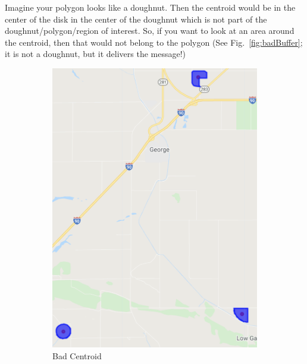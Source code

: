 \documentclass{article}
\begin{document}
{\color{red}{Warning:}} 
Imagine your polygon looks like a doughnut.
Then the centroid would be in the center 
of the disk in the center
of the doughnut which is not part of the doughnut/polygon/region of interest.
So, if you want to look at an area around 
the centroid, then
that would not belong to the polygon (See Fig.~\ref{fig:badBuffer}; it is not a doughnut, 
but it delivers the message!)
\begin{figure}[!h]
  \centering
  \begin{subfigure}[b]{0.4\textwidth}
    \includegraphics[width=1.1\textwidth]{figures/badCentroid}
    \caption{Bad Centroid}
    \label{fig:badCentroid}
  \end{subfigure}
  \qquad 
  \begin{subfigure}[b]{.4\textwidth}

\end{subfigure}
\end{figure}
\end{document}
